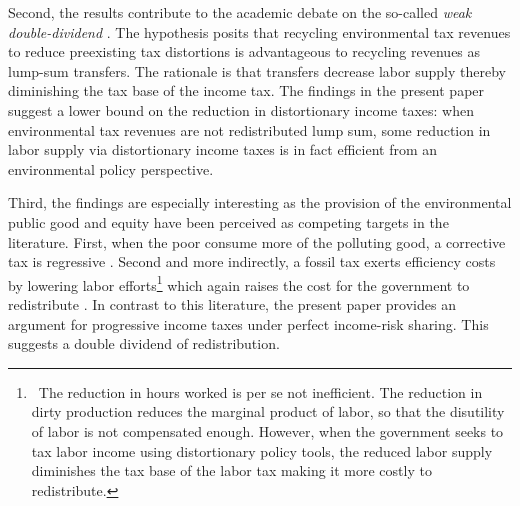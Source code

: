 Second, the results contribute to the academic debate on the so-called \textit{weak double-dividend} \citep[for example:][]{LansBovenberg1994EnvironmentalTaxation, LansBovenberg1996OptimalAnalyses}. The hypothesis posits that recycling environmental tax revenues to reduce preexisting tax distortions is advantageous to recycling  revenues as lump-sum transfers. The rationale is that transfers decrease labor supply thereby diminishing the tax base of the income tax. %
The findings in the present paper suggest a lower bound on the reduction in distortionary income taxes: when environmental tax revenues are not redistributed lump sum, some reduction in labor supply via distortionary income taxes is in fact efficient from an environmental policy perspective. %

Third, the findings are especially interesting as the provision of the environmental public good and equity have been perceived as competing targets in the literature. First, when the poor consume more of the polluting good, a corrective tax is regressive \citep{ Fried2018TheGenerations, Sager2019IncomeCurves}. %
Second and more indirectly, a fossil tax exerts efficiency costs by lowering labor efforts\footnote{\ The reduction in hours worked is per se not inefficient. The reduction in dirty production reduces the marginal product of labor, so that the disutility of labor is not compensated enough. However, when the government seeks to tax labor income using distortionary policy tools, the reduced labor supply diminishes the tax base of the labor tax making it more costly to redistribute.} which again raises the cost for the government to redistribute \citep{Dobkowitz2022}. 
In contrast to this literature, the present paper provides an argument for progressive income taxes under perfect income-risk sharing. This suggests a double dividend of redistribution. %
